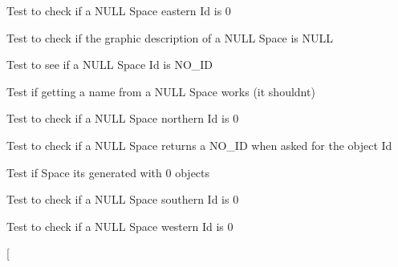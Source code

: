 \begin{DoxyRefList}
\item[\label{test__test000232}%
\hypertarget{test__test000232}{}%
Member \hyperlink{space__test_8h_a249293510e61c6d5465f52c14343d02b}{test2\+\_\+space\+\_\+get\+\_\+east} ()]Test to check if a N\+U\+LL Space eastern Id is 0  
\item[\label{test__test000236}%
\hypertarget{test__test000236}{}%
Member \hyperlink{space__test_8h_a392aef93729ff4dad9d0ced1bc3de780}{test2\+\_\+space\+\_\+get\+\_\+graphic\+\_\+description} ()]Test to check if the graphic description of a N\+U\+LL Space is N\+U\+LL  
\item[\label{test__test000226}%
\hypertarget{test__test000226}{}%
Member \hyperlink{space__test_8h_af9087176b0d3c41d83a17a4918b13e31}{test2\+\_\+space\+\_\+get\+\_\+id} ()]Test to see if a N\+U\+LL Space Id is N\+O\+\_\+\+ID  
\item[\label{test__test000224}%
\hypertarget{test__test000224}{}%
Member \hyperlink{space__test_8h_aee88ed31c63efc674051a4563aed86e2}{test2\+\_\+space\+\_\+get\+\_\+name} ()]Test if getting a name from a N\+U\+LL Space works (it shouldn\textquotesingle{}t)  
\item[\label{test__test000228}%
\hypertarget{test__test000228}{}%
Member \hyperlink{space__test_8h_a61891c9cebb9d26dc9f149ad8341517c}{test2\+\_\+space\+\_\+get\+\_\+north} ()]Test to check if a N\+U\+LL Space northern Id is 0  
\item[\label{test__test000240}%
\hypertarget{test__test000240}{}%
Member \hyperlink{space__test_8h_aeb550bccb20cc553cd7b26b433d74c4b}{test2\+\_\+space\+\_\+get\+\_\+object\+\_\+id} ()]Test to check if a N\+U\+LL Space returns a N\+O\+\_\+\+ID when asked for the object Id  
\item[\label{test__test000242}%
\hypertarget{test__test000242}{}%
Member \hyperlink{space__test_8h_a18daf22447654e3e69036e34f6b029a7}{test2\+\_\+space\+\_\+get\+\_\+objects\+\_\+number} ()]Test if Space its generated with 0 objects  
\item[\label{test__test000230}%
\hypertarget{test__test000230}{}%
Member \hyperlink{space__test_8h_a40fe07c07c1069023b362a9e506c4c59}{test2\+\_\+space\+\_\+get\+\_\+south} ()]Test to check if a N\+U\+LL Space southern Id is 0  
\item[\label{test__test000234}%
\hypertarget{test__test000234}{}%
Member \hyperlink{space__test_8h_af1cf02b01c007aec0684186b39666c32}{test2\+\_\+space\+\_\+get\+\_\+west} ()]Test to check if a N\+U\+LL Space western Id is 0  
\item[\label{test__test000248}%

\end{DoxyRefList}
